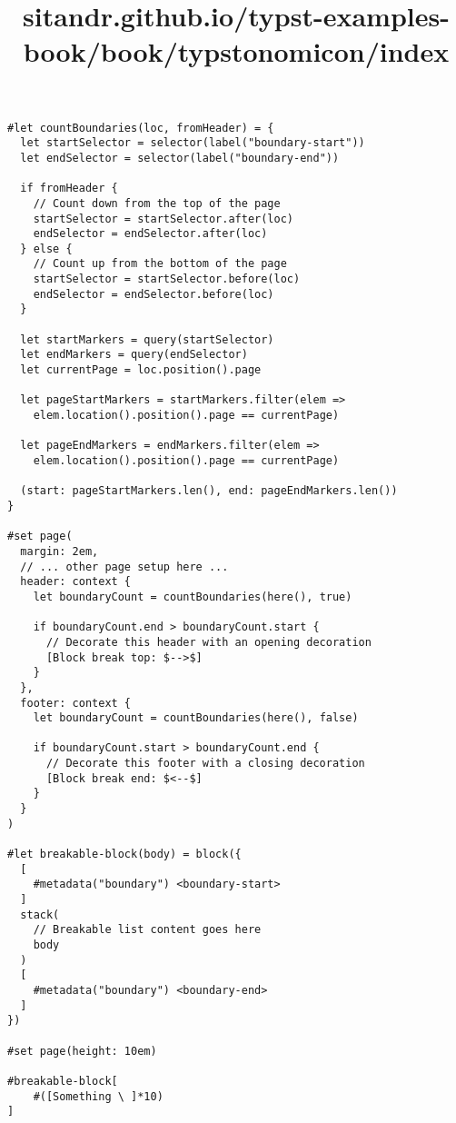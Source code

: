 \begin{verbatim}
#let countBoundaries(loc, fromHeader) = {
  let startSelector = selector(label("boundary-start"))
  let endSelector = selector(label("boundary-end"))

  if fromHeader {
    // Count down from the top of the page
    startSelector = startSelector.after(loc)
    endSelector = endSelector.after(loc)
  } else {
    // Count up from the bottom of the page
    startSelector = startSelector.before(loc)
    endSelector = endSelector.before(loc)
  }

  let startMarkers = query(startSelector)
  let endMarkers = query(endSelector)
  let currentPage = loc.position().page

  let pageStartMarkers = startMarkers.filter(elem =>
    elem.location().position().page == currentPage)

  let pageEndMarkers = endMarkers.filter(elem =>
    elem.location().position().page == currentPage)

  (start: pageStartMarkers.len(), end: pageEndMarkers.len())
}

#set page(
  margin: 2em,
  // ... other page setup here ...
  header: context {
    let boundaryCount = countBoundaries(here(), true)

    if boundaryCount.end > boundaryCount.start {
      // Decorate this header with an opening decoration
      [Block break top: $-->$]
    }
  },
  footer: context {
    let boundaryCount = countBoundaries(here(), false)

    if boundaryCount.start > boundaryCount.end {
      // Decorate this footer with a closing decoration
      [Block break end: $<--$]
    }
  }
)

#let breakable-block(body) = block({
  [
    #metadata("boundary") <boundary-start>
  ]
  stack(
    // Breakable list content goes here
    body
  )
  [
    #metadata("boundary") <boundary-end>
  ]
})

#set page(height: 10em)

#breakable-block[
    #([Something \ ]*10)
]
\end{verbatim}

\pandocbounded{}

\pandocbounded{}


\title{sitandr.github.io/typst-examples-book/book/typstonomicon/index}

